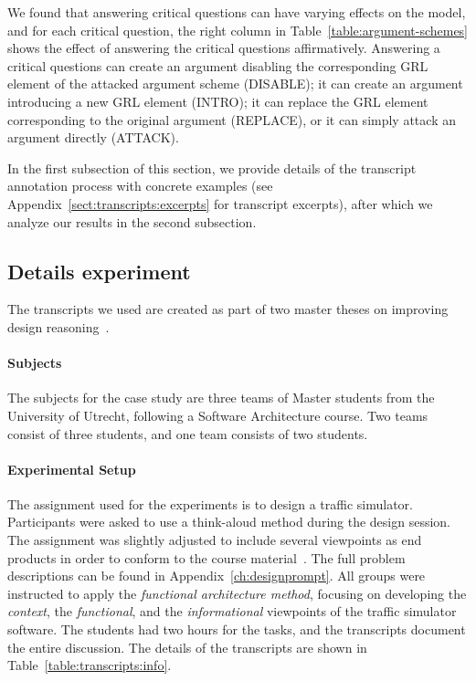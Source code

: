 We found that answering critical questions can have varying effects on the model, and for each critical question, the right column in Table~\ref{table:argument-schemes} shows the effect of answering the critical questions affirmatively. Answering a critical questions can create an argument disabling the corresponding GRL element of the attacked argument scheme (\textsf{DISABLE}); it can create an argument introducing a new GRL element (\textsf{INTRO}); it can replace the GRL element corresponding to the original argument (\textsf{REPLACE}), or it can simply attack an argument directly (\textsf{ATTACK}).

In the first subsection of this section, we provide details of the transcript annotation process with concrete examples (see Appendix~\ref{sect:transcripts:excerpts} for transcript excerpts), after which we analyze our results in the second subsection.

\subsection{Details experiment}

The transcripts we used are created as part of two master theses on improving design reasoning~\cite{masterthesis1,masterthesis2}.

\paragraph{Subjects} The subjects for the case study are three teams of Master students from the University of Utrecht, following a Software Architecture course. Two teams consist of three students, and one team consists of two students.

\paragraph{Experimental Setup} The assignment used for the experiments is to design a traffic simulator. Participants were asked to use a think-aloud method during the design session. The assignment was slightly adjusted to include several viewpoints as end products in order to conform to the course material~\cite{Bass:2012:SAP:2392670}. The full problem descriptions can be found in Appendix~\ref{ch:designprompt}. All groups were instructed to apply the \emph{functional architecture method}, focusing on developing the \emph{context}, the \emph{functional}, and the \emph{informational} viewpoints of the traffic simulator software. The students had two hours for the tasks, and the transcripts document the entire discussion. The details of the transcripts are shown in Table~\ref{table:transcripts:info}.

